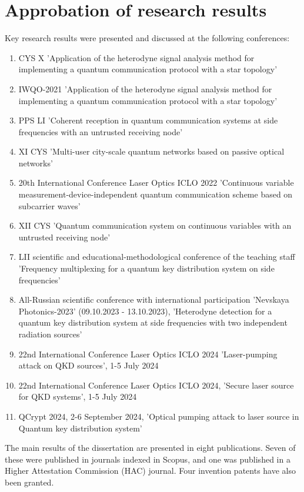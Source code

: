 \section*{Approbation of research results}
Key research results were presented and discussed at the following conferences:
\begin{enumerate}
    \item CYS X 'Application of the heterodyne signal analysis method for implementing a quantum communication protocol with a star topology'
    \item IWQO-2021 'Application of the heterodyne signal analysis method for implementing a quantum communication protocol with a star topology'
    \item PPS LI 'Coherent reception in quantum communication systems at side frequencies with an untrusted receiving node'
    \item XI CYS 'Multi-user city-scale quantum networks based on passive optical networks'
    \item 20th International Conference Laser Optics ICLO 2022 'Continuous variable measurement-device-independent quantum communication scheme based on subcarrier waves'
    \item XII CYS 'Quantum communication system on continuous variables with an untrusted receiving node'
    \item LII scientific and educational-methodological conference of the teaching staff 'Frequency multiplexing for a quantum key distribution system on side frequencies'
    \item All-Russian scientific conference with international participation 'Nevskaya Photonics-2023' (09.10.2023 - 13.10.2023), 'Heterodyne detection for a quantum key distribution system at side frequencies with two independent radiation sources'
    \item 22nd International Conference Laser Optics ICLO 2024 'Laser-pumping attack on QKD sources', 1-5 July 2024
    \item 22nd International Conference Laser Optics ICLO 2024, 'Secure laser source for QKD systems', 1-5 July 2024
    \item QCrypt 2024, 2-6 September 2024, 'Optical pumping attack to laser source in Quantum key distribution system'
\end{enumerate}
The main results of the dissertation are presented in eight publications. Seven of these were published in journals indexed in Scopus, and one was published in a Higher Attestation Commission (HAC) journal. Four invention patents have also been granted.
